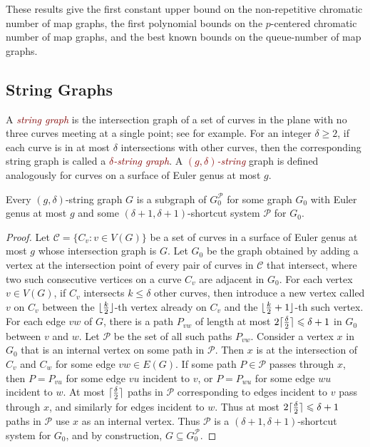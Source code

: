 \documentclass{patmorin}
\newcommand{\defin}[1]{\textcolor{Maroon}{\emph{#1}}}
\DeclarePairedDelimiter{\ceil}{\lceil}{\rceil}
\DeclarePairedDelimiter{\floor}{\lfloor}{\rfloor}
\newcommand{\PP}{\mathcal{P}}
\renewcommand{\geq}{\geqslant}
\renewcommand{\leq}{\leqslant}
\begin{document}
These results give 
the first constant upper bound on the non-repetitive chromatic number of map graphs,  
the first polynomial bounds on the $p$-centered chromatic number of map graphs, and
the best known bounds on the queue-number of map graphs.

\subsection{String Graphs}

A \defin{string graph} is the intersection graph of a set of curves in the plane with no three curves meeting at a single point; see  \cite{PachToth-DCG02,FP10,FP14} for example. For an integer $\delta\geq 2$, if each curve is in at most $\delta$ intersections with other curves, then the corresponding string graph is called a \defin{$\delta$-string graph}. A \defin{$(g,\delta)$-string} graph is defined analogously for curves on a surface of Euler genus at most $g$.

\begin{lem}
\label{StringShortcut}
Every $(g,\delta)$-string graph $G$ is a subgraph of $G_0^\PP$ for some graph $G_0$ with Euler genus at most $g$ and some $(\delta+1,\delta+1 )$-shortcut system $\PP$ for $G_0$.
\end{lem}

\begin{proof}
Let $\mathcal{C}=\{C_v:v\in V(G)\}$ be a set of curves in a surface of Euler genus at most $g$ whose intersection graph is $G$.  Let $G_0$ be the graph obtained by adding a vertex at the intersection point of every pair of curves in $\mathcal{C}$ that intersect,  where two such consecutive vertices on a curve $C_v$ are adjacent in $G_0$. For each vertex $v\in V(G)$, if $C_v$ intersects $k\leq\delta$ other curves, then introduce a new vertex called $v$ on $C_v$ between the
$\floor{\frac{k}{2}}$-th vertex already on $C_v$ and the $\floor{\frac{k}{2}+1}$-th such vertex. For each edge $vw$ of $G$, there is a path $P_{vw}$ of length at most $2\ceil{\frac{\delta}{2}}\leq \delta+1$ in $G_0$ between $v$ and $w$. Let $\PP$ be the set of all such paths $P_{vw}$. Consider a vertex $x$ in $G_0$ that is an internal vertex on some path in $\PP$. Then $x$ is at the intersection of $C_v$ and $C_w$ for some edge $vw\in E(G)$. If some path $P\in \PP$ passes through $x$, then $P=P_{vu}$ for some edge $vu$ incident to $v$, or $P=P_{wu}$ for some edge $wu$ incident to $w$. At most $\ceil{\frac{\delta}{2}}$ paths in $\PP$ corresponding to edges incident to $v$ pass through $x$, and similarly for edges incident to $w$. Thus at most $2\ceil{\frac{\delta}{2}}\leq\delta+1$ paths in $\PP$ use $x$ as an internal vertex. Thus $\PP$ is a $(\delta+1,\delta+1)$-shortcut system for $G_0$, and by construction, $G \subseteq G_0^\PP$.
\end{proof}
\end{document}
